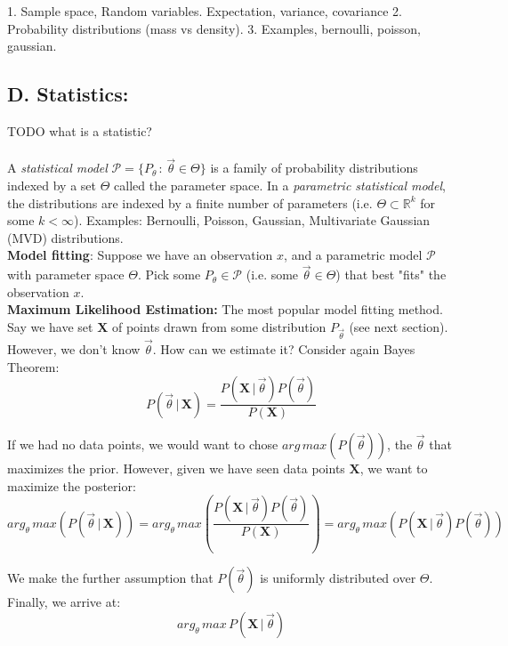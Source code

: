 \documentclass[10pt]{article}
\begin{document}
			1. Sample space, Random variables. Expectation, variance, covariance
			2. Probability distributions (mass vs density). 
			3. Examples, bernoulli, poisson, gaussian.  
							
		\subsection*{D. Statistics:}
			TODO what is a statistic? \\ \\
			A \textit{statistical model} $\mathcal{P} = \{ P_\theta \, : \, \vec \theta \in \Theta \}$ is a family of 
			probability distributions indexed by a set $\Theta$ called the parameter space. In a \textit{parametric 
			statistical model}, the distributions are indexed by a finite number of parameters 
			(i.e. $\Theta \subset \mathbb{R}^k$ for some $ k < \infty$). Examples: Bernoulli, Poisson, 
			Gaussian, Multivariate Gaussian (MVD) distributions. \\
			
			\noindent \textbf{Model fitting}: Suppose we have an observation $x$, and a parametric model 
			$\mathcal P$ with parameter space $\Theta$. Pick some $P_\theta \in \mathcal P$ (i.e. some 
			$\vec \theta \in \Theta$) that best "fits" the observation $x$. \\
			
			\noindent \textbf{Maximum Likelihood Estimation:}  The most popular model fitting method.
			Say we have set $\mathbf X$ of points drawn from some distribution $P_{\vec \theta}$ (see 
			next section). However, we don't know $\vec \theta$. How can we estimate it? Consider again Bayes Theorem: 
			$$ P(\vec \theta \, | \, \mathbf{X}) = \frac{P(\mathbf{X} \, | \, \vec \theta) P(\vec \theta)}{P(\mathbf X)} $$
				
			\noindent If we had no data points, we would want to chose $arg \, max(P(\vec \theta)) $, the $\vec \theta$ 
			that maximizes the prior. However, given we have seen data points $\mathbf{X}$, we want to maximize 
			the posterior:
			$$arg_\theta \, max (P(\vec \theta \, | \, \mathbf{X})) = 
			arg_\theta \, max (\frac{P(\mathbf{X} \, | \, \vec \theta)P(\vec \theta)}{P(\mathbf{X})}) = 
			arg_\theta \, max(P(\mathbf{X} \, | \, \vec \theta)P(\vec \theta)) $$
				
			\noindent We make the further assumption that $P(\vec \theta)$ is uniformly distributed over $\Theta$. 
			Finally, we arrive at:
			$$arg_\theta \, max \, P(\mathbf{X} \, | \, \vec \theta) $$ 
			
\end{document}
